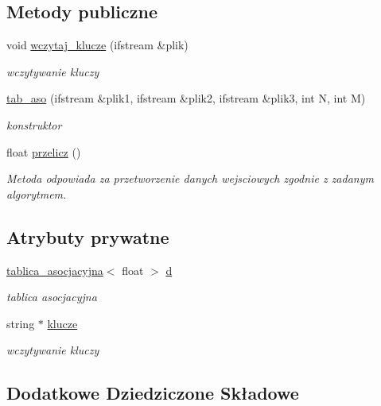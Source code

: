 \subsection*{Metody publiczne}
\begin{DoxyCompactItemize}
\item 
void \hyperlink{classtab__aso_ac1621845f913e272d7e1cc1938836f44}{wczytaj\-\_\-klucze} (ifstream \&plik)
\begin{DoxyCompactList}\small\item\em wczytywanie kluczy \end{DoxyCompactList}\item 
\hyperlink{classtab__aso_a93cab2f07153d409d0f448996af9b864}{tab\-\_\-aso} (ifstream \&plik1, ifstream \&plik2, ifstream \&plik3, int N, int M)
\begin{DoxyCompactList}\small\item\em konstruktor \end{DoxyCompactList}\item 
float \hyperlink{classtab__aso_a9aaf9c03908c617f51591b3fa32b4c2a}{przelicz} ()
\begin{DoxyCompactList}\small\item\em Metoda odpowiada za przetworzenie danych wejsciowych zgodnie z zadanym algorytmem. \end{DoxyCompactList}\end{DoxyCompactItemize}
\subsection*{Atrybuty prywatne}
\begin{DoxyCompactItemize}
\item 
\hyperlink{classtablica__asocjacyjna}{tablica\-\_\-asocjacyjna}$<$ float $>$ \hyperlink{classtab__aso_a5ee486c3f7635778bcb585cc655f5245}{d}
\begin{DoxyCompactList}\small\item\em tablica asocjacyjna \end{DoxyCompactList}\item 
string $\ast$ \hyperlink{classtab__aso_aa9d7d3471353afaa7585c6bbcd8e26a5}{klucze}
\begin{DoxyCompactList}\small\item\em wczytywanie kluczy \end{DoxyCompactList}\end{DoxyCompactItemize}
\subsection*{Dodatkowe Dziedziczone Składowe}


